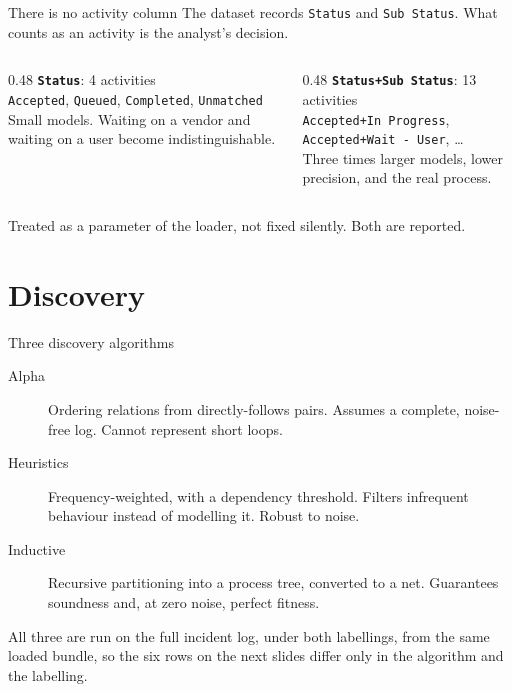 \documentclass[aspectratio=169]{beamer}
\newcommand{\act}[1]{\texttt{\small #1}}
\begin{document}
\begin{frame}{There is no activity column}
The dataset records \act{Status} and \act{Sub Status}. What counts as an
activity is the analyst's decision.
\bigskip
\begin{columns}[T]
\begin{column}{0.48\textwidth}
\textbf{\act{Status}}: 4 activities\\[0.3em]
\act{Accepted}, \act{Queued}, \act{Completed}, \act{Unmatched}\\[0.6em]
Small models. Waiting on a vendor and waiting on a user become
indistinguishable.
\end{column}
\begin{column}{0.48\textwidth}
\textbf{\act{Status+Sub Status}}: 13 activities\\[0.3em]
\act{Accepted+In Progress}, \act{Accepted+Wait - User}, \dots\\[0.6em]
Three times larger models, lower precision, and the real process.
\end{column}
\end{columns}
\bigskip
\begin{center}
Treated as a parameter of the loader, not fixed silently. Both are reported.
\end{center}
\end{frame}


\section{Discovery}

\begin{frame}{Three discovery algorithms}
\begin{description}
  \item[Alpha] Ordering relations from directly-follows pairs. Assumes a
        complete, noise-free log. Cannot represent short loops.
  \item[Heuristics] Frequency-weighted, with a dependency threshold. Filters
        infrequent behaviour instead of modelling it. Robust to noise.
  \item[Inductive] Recursive partitioning into a process tree, converted to a
        net. Guarantees soundness and, at zero noise, perfect fitness.
\end{description}
\bigskip
All three are run on the full incident log, under both labellings, from the same
loaded bundle, so the six rows on the next slides differ only in the
algorithm and the labelling.
\end{frame}
\end{document}
